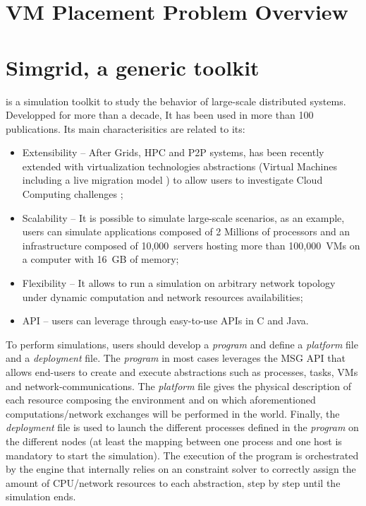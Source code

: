 \section{VM Placement Problem Overview}
\label{sec:vmpp}

\section{Simgrid, a generic toolkit}
\label{sec:sg}

\sg is a simulation toolkit to study the behavior of
large-scale distributed systems.  Developped for more than  a decade, It has been used in more than 100
publications.  Its main characterisitics are related to its:
\begin{itemize}
\item Extensibility -- After Grids, HPC and P2P
  systems, \sg has been recently extended with virtualization technologies abstractions
(\ie Virtual Machines including a live migration model \cite{Hirofuchi:2013:ALM:2568486.2568524}) to allow users to investigate Cloud
Computing challenges \cite{lucas:cloud2014};
\item Scalability -- It is possible to simulate large-scale scenarios,
  as an example, users can simulate applications composed of 2
  Millions of processors and an infrastructure composed of 10,000~servers hosting more than
  100,000~VMs on a computer with 16~GB of memory;
\item  Flexibility -- It allows to run a simulation on arbitrary network
  topology under dynamic computation and network resources
  availabilities;
\item API --  users can leverage \sg through easy-to-use APIs in C
  and Java.
\end{itemize}

To perform simulations, users should develop a \emph{program} and
define a \emph{platform} file and a \emph{deployment} file. The
\emph{program} in most cases leverages the \sg MSG API that allows
end-users to create and execute \sg abstractions such as processes,
tasks, VMs and network-communications. The \emph{platform} file gives
the physical description of each resource composing the environment
and on which aforementioned computations/network exchanges will be
performed in the \sg
world.
Finally, the \emph{deployment} file is used to launch the different
\sg processes defined in the \emph{program} on the different nodes (at
least the mapping between one process and one host is mandatory to
start the simulation). The execution of the program is orchestrated by
the \sg engine that internally relies on an constraint solver to
correctly assign the amount of CPU/network resources to each \sg
abstraction, step by step until the simulation ends.

